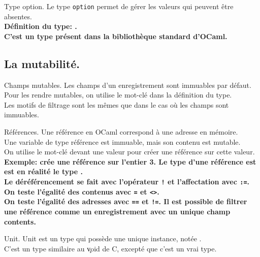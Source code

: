\documentclass[french, 11pt]{article}
\begin{document}
\begin{defi}{Type option.}{}
    Le type \texttt{option} permet de gérer les valeurs qui peuvent être absentes.\\
    \bf{Définition du type:} .\\
    C'est un type présent dans la bibliothèque standard d'OCaml.
\end{defi}

\subsection{La mutabilité.}

\begin{defi}{Champs mutables.}{}
    Les champs d'un enregistrement sont immuables par défaut.\\
    Pour les rendre mutables, on utilise le mot-clé  dans la définition du type.\\
    Les motifs de filtrage sont les mêmes que dans le cas où les champs sont immuables.
\end{defi}

\begin{defi}{Références.}{}
    Une référence en OCaml correspond à une adresse en mémoire.\\
    Une variable de type référence est immuable, mais son contenu est mutable.\\
    On utilise le mot-clé  devant une valeur pour créer une référence sur cette valeur.\n
    \bf{Exemple:}  crée une référence sur l'entier 3.\n
    Le type d'une référence est  est en réalité le type .\\
    Le déréférencement se fait avec l'opérateur \texttt{!} et l'affectation avec \texttt{:=}.\n
    On teste l'égalité des contenus avec \texttt{=} et \texttt{<>}.\\
    On teste l'égalité des adresses avec \texttt{==} et \texttt{!=}.\n
    Il est possible de filtrer une référence comme un enregistrement avec un unique champ contents.
\end{defi}

\vspace*{-0.3cm}

\begin{defi}{Unit.}{}
    Unit est un type qui possède une unique instance, notée \ocaml{()}.\\
    C'est un type similaire au \c{void} de C, excepté que c'est un vrai type.
\end{defi}
\end{document}
